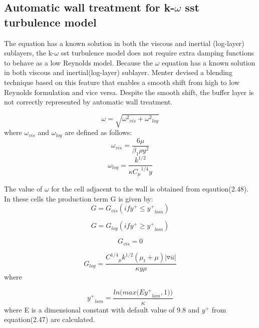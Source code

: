 \subsection{Automatic wall treatment for k-$\omega$ sst turbulence model}
The equation has a known solution in both the viscous and inertial
(log-layer) sublayers, the k-$\omega$ sst turbulence model does not
require extra damping functions to behave as a low Reynolds model.
Because the $\omega$ equation has a known solution in both viscous and
inertial(log-layer) sublayer. Menter \cite{Menter} devised a blending technique
based on this feature that enables a smooth shift from high to low
Reynolds formulation and vice versa.  Despite the smooth shift, the
buffer layer is not correctly represented by automatic wall treatment.

\begin{equation}
{\omega}={\sqrt{{{{{\omega}^2}_{vis}}}+{{{{\omega}^2}_{log}}}}}
\end{equation}
where ${\omega}_{vis}$ and ${\omega}_{log}$ are defined as follows:
\begin{equation}
{{\omega}_{vis}}={\frac{6\mu}{{{\beta}_1}{\rho}{y^2}}}
\end{equation}
\begin{equation}
{{\omega}_{log}}={\frac{{k}^{1/2}}{\kappa {{C_{\mu}}^{1/4}} y}}
\end{equation}

The value of $\omega$ for the cell adjacent to the wall is obtained
from eqaution(2.48). In these cells the production term G is given by:
\begin{equation}
G={G_{vis}}   (if {y^+}\le{{{y}^+}_{lam}})
\end{equation}

\begin{equation}
G={{G}_{log}} (if {{y^+}}\ge{{{y}^+}_{lam}})
\end{equation}

\begin{equation}
{G_{vis}}=0
\end{equation}

\begin{equation}
{G_{log}}={\frac{{{C}^{1/4}}_{\mu}
    {{k}^{1/2}}({{\mu}_t}+{\mu})\vert{{\triangledown
        \overline{u}}}\vert}{\kappa y {\rho}}}
\end{equation}
where

\begin{equation}
{{y^+}_{lam}}={\frac{{ln\bigg(max\bigg(E{{y^+}_{lam}},1\bigg)\bigg)}}{\kappa}}
\end{equation}
where E is a dimensional constant with default value of 9.8 and
${y}^+$ from equation(2.47) are calculated.

